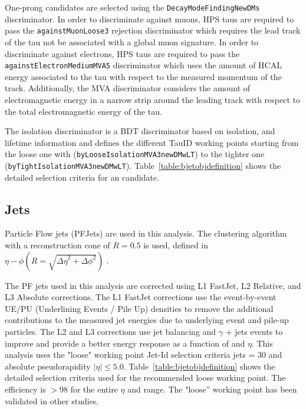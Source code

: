 One-prong \hadtau candidates are selected using the \texttt{Decay\-Mode\-Finding\-New\-DMs} discriminator. In order to discriminate against muons, HPS taus are required to pass the \texttt{against\-Muon\-Loose3} rejection discriminator which requires the lead track of the tau not be associated with a global muon signature. In order to discriminate against electrons, HPS taus are required to pass the \texttt{against\-Electron\-Medium\-MVA5} discriminator which uses the amount of HCAL energy associated to the tau with respect to the measured momentum of the track. Additionally, the MVA discriminator considers the amount of electromagnetic energy in a narrow strip around the leading track with respect to the total electromagnetic energy of the tau. 

The isolation discriminator is a BDT \cite{Hocker:2007ht} discriminator based on isolation, \pt and \hadtau lifetime information and defines the different TauID working points starting from the loose one with (\texttt{byLoose\-Isolation\-MVA3\-newDMwLT}) to the tighter one (\texttt{byTight\-Isolation\-MVA3new\-DMwLT}). Table~\ref{table:bjetobjdefinition} shows the detailed selection criteria for an \hadtau candidate.

\subsection{Jets}
\label{subsec::objsel_jet}

	

Particle Flow jets (PFJets) are used in this analysis. The \antikt clustering algorithm with a reconstruction cone of \ensuremath{R = 0.5} is used, defined in \ensuremath{\eta-\phi (R = \sqrt{{\Delta \eta}^2 + {\Delta \phi}^{2}})} \cite{1126-6708-2008-04-063}. 

The PF jets used in this analysis are corrected using L1 FastJet, L2 Relative, and L3 Absolute corrections. The L1 FastJet corrections use the event-by-event UE/PU (Underlining Events / Pile Up) densities to remove the additional contributions to the measured jet energies due to underlying event and pile-up particles. The L2 and L3 corrections use jet balancing and \ensuremath{\gamma} + jets events to improve and provide a better energy response as a function of \pt and \ensuremath{\eta}. This analysis uses the "loose" working point Jet-Id selection criteria jets \pt = 30 \gev and absolute pseudorapidity $|\eta| \le 5.0$. Table~\ref{table:bjetobjdefinition} shows the detailed selection criteria used for the recommended loose working point. The efficiency is $> 98$ for the entire $\eta$ and \pt range. The "loose'' working point has been validated in other studies.


